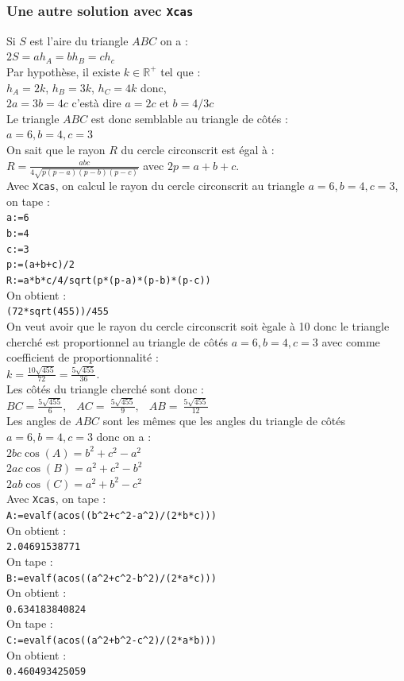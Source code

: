 \documentclass[a4paper,11pt]{book}
\newcommand{\R}{{\mathbb{R}}}
\begin{document}
\subsubsection{Une autre solution avec {\tt Xcas}}
Si $S$ est l'aire du triangle $ABC$ on a :\\
$2S=ah_A=bh_B=ch_c$\\
Par hypoth\`ese, il existe $k\in \R^+$ tel que :\\
$h_A=2k$, $h_B=3k$, $h_C=4k$ donc,\\
$2a=3b=4c$ c'est\`a dire $a=2c$ et $b=4/3c$\\
Le triangle $ABC$ est donc semblable au triangle de c\^ot\'es :\\
$a=6, b=4, c=3$\\
On sait que le rayon $R$ du cercle circonscrit est \'egal \`a :\\
$\displaystyle R=\frac{abc}{4\sqrt{p(p-a)(p-b)(p-c)}}$ avec $2p=a+b+c$.\\
 Avec {\tt Xcas}, on calcul le rayon du cercle circonscrit au triangle 
$a=6, b=4, c=3$, on tape :\\
{\tt a:=6}\\
{\tt b:=4}\\
{\tt c:=3}\\
{\tt p:=(a+b+c)/2}\\
{\tt R:=a*b*c/4/sqrt(p*(p-a)*(p-b)*(p-c))}\\
On obtient : \\
{\tt (72*sqrt(455))/455}\\
On veut avoir que le rayon du cercle circonscrit soit \`egale \`a 10 donc le 
triangle cherch\'e est proportionnel au triangle de c\^ot\'es 
$a=6, b=4, c=3$ avec comme coefficient de proportionnalit\'e :\\
$k= \frac{10\sqrt{455}}{72}=\frac{5\sqrt{455}}{36}$.\\
Les c\^ot\'es du triangle cherch\'e sont donc :\\
$BC=\displaystyle \frac{5 \sqrt{455}}{6},\ $
$\ AC=\displaystyle\ \frac{5 \sqrt{455}}{9},\ $
$\ AB=\displaystyle\ \frac{5 \sqrt{455}}{12}\ $\\
Les angles de $ABC$ sont les m\^emes que les angles du triangle de c\^ot\'es 
$a=6, b=4, c=3$ donc on a :\\
$2bc\cos(A)=b^2+c^2-a^2$ \\
$2ac\cos(B)=a^2+c^2-b^2$ \\
$2ab\cos(C)=a^2+b^2-c^2$ \\
 Avec {\tt Xcas}, on tape :\\
{\tt A:=evalf(acos((b\verb|^|2+c\verb|^|2-a\verb|^|2)/(2*b*c)))}\\
On obtient : \\
{\tt 2.04691538771}\\
On tape :\\
{\tt B:=evalf(acos((a\verb|^|2+c\verb|^|2-b\verb|^|2)/(2*a*c)))}\\
On obtient : \\
{\tt 0.634183840824}\\
On tape :\\
{\tt C:=evalf(acos((a\verb|^|2+b\verb|^|2-c\verb|^|2)/(2*a*b)))}\\
On obtient : \\
{\tt 0.460493425059}
\end{document}
